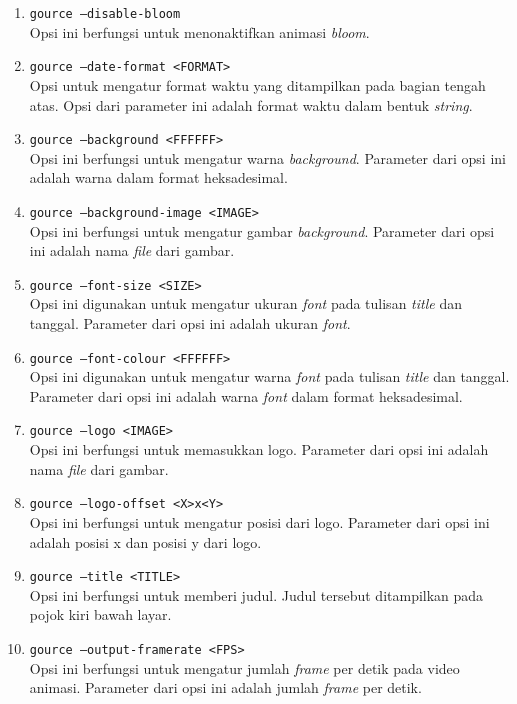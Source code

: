 \begin{enumerate}
\item \texttt{gource --disable-bloom}\\
Opsi ini berfungsi untuk menonaktifkan animasi \textit{bloom}.

\item \texttt{gource --date-format <FORMAT>}\\ 
Opsi untuk mengatur format waktu yang ditampilkan pada bagian tengah atas. Opsi dari parameter ini adalah format waktu dalam bentuk \textit{string}.

\item \texttt{gource --background <FFFFFF>}\\
Opsi ini berfungsi untuk mengatur warna \textit{background}. Parameter dari opsi ini adalah warna dalam format heksadesimal.

\item \texttt{gource --background-image <IMAGE>}\\
Opsi ini berfungsi untuk mengatur gambar \textit{background}. Parameter dari opsi ini adalah nama \textit{file} dari gambar.

\item \texttt{gource --font-size <SIZE>}\\
Opsi ini digunakan untuk mengatur ukuran \textit{font} pada tulisan \textit{title} dan tanggal. Parameter dari opsi ini adalah ukuran \textit{font}.  

\item \texttt{gource --font-colour <FFFFFF>}\\
Opsi ini digunakan untuk mengatur warna \textit{font} pada tulisan \textit{title} dan tanggal. Parameter dari opsi ini adalah warna \textit{font} dalam format heksadesimal.

\item \texttt{gource --logo <IMAGE>}\\
Opsi ini berfungsi untuk memasukkan logo. Parameter dari opsi ini adalah nama \textit{file} dari gambar.

\item \texttt{gource --logo-offset <X>x<Y>}\\
Opsi ini berfungsi untuk mengatur posisi dari logo. Parameter dari opsi ini adalah posisi x dan posisi y dari logo. 

\item \texttt{gource --title <TITLE>}\\
Opsi ini berfungsi untuk memberi judul. Judul tersebut ditampilkan pada pojok kiri bawah layar. 

\item \texttt{gource --output-framerate <FPS>}\\
Opsi ini berfungsi untuk mengatur jumlah \textit{frame} per detik pada video animasi. Parameter dari opsi ini adalah jumlah \textit{frame} per detik.


\end{enumerate}
